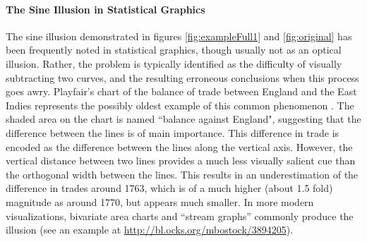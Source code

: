 \documentclass[12pt]{article}\usepackage[]{graphicx}\usepackage[]{color}
\begin{document}
\paragraph{The Sine Illusion in Statistical Graphics}\label{statisticalgraphics}\hfill\newline
The sine illusion demonstrated in figures \ref{fig:exampleFull1} and \ref{fig:original} has been frequently noted in statistical graphics, though usually not as an optical illusion. Rather, the problem is typically identified as the difficulty of visually subtracting two curves, and the resulting erroneous conclusions when this process goes awry. Playfair's chart of the balance of trade between England and the East Indies represents the possibly oldest example of this common phenomenon \citep{playfair, playfair2}. The shaded area on the chart is named ``balance against England", suggesting that the difference between the lines is of main importance. This difference in trade is encoded as the difference between the lines along the vertical axis. However, the vertical distance  between  two lines provides a  much less visually salient cue than the orthogonal width between the lines. This results in  an underestimation \citep{cleveland:1984} of the difference in trades around 1763, which is of a much higher (about 1.5 fold) magnitude as around 1770, but appears much smaller. In more modern visualizations, bivariate area charts and ``stream graphs'' \citep{stackedgraphs} commonly produce the illusion (see an example at \url{http://bl.ocks.org/mbostock/3894205}). 
% 
\end{document}
